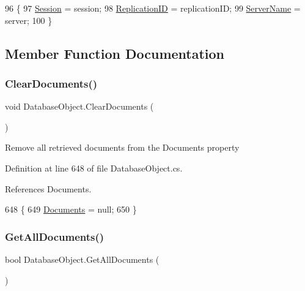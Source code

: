 \begin{DoxyCode}
96                                                                                       \{
97         \mbox{\hyperlink{class_database_object_aa8484162b7d2a7c4c9426bca13c64c07}{Session}} = session;
98         \mbox{\hyperlink{class_database_object_aaa091ee1a9a86d2d10fe2381ee2d1f4c}{ReplicationID}} = replicationID;
99         \mbox{\hyperlink{class_database_object_ad6bfcd30152f7a115ac5a1c7fbfa9fcb}{ServerName}} = server;
100     \}
\end{DoxyCode}


\subsection{Member Function Documentation}
\mbox{\label{class_database_object_af9c4789dea0a14e5a2f914758d3bc54e}} 
\subsubsection{\texorpdfstring{Clear\+Documents()}{ClearDocuments()}}
{\footnotesize\ttfamily void Database\+Object.\+Clear\+Documents (\begin{DoxyParamCaption}{ }\end{DoxyParamCaption})}



Remove all retrieved documents from the \textquotesingle{}Documents\textquotesingle{} property 



Definition at line 648 of file Database\+Object.\+cs.



References Documents.


\begin{DoxyCode}
648                                  \{
649         \mbox{\hyperlink{class_database_object_afaf1159aa427c5bcce01c4b8c6f34514}{Documents}} = null;
650     \}
\end{DoxyCode}
\mbox{\label{class_database_object_ad3010e55b2e75d0863e168fed1e279c5}} 
\subsubsection{\texorpdfstring{Get\+All\+Documents()}{GetAllDocuments()}}
{\footnotesize\ttfamily bool Database\+Object.\+Get\+All\+Documents (\begin{DoxyParamCaption}{ }\end{DoxyParamCaption})}



